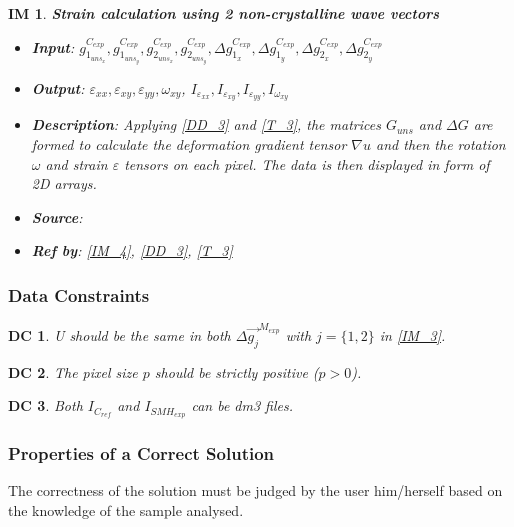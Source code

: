 \documentclass[12pt]{article}
\newtheorem{DC}{DC}
\newtheorem{IM}{IM}
\begin{document}
\begin{IM}
\label{IM_5}
\noindent\colorbox{shadecolorIM}{\normalfont \textbf{Strain calculation using 2 non-crystalline wave vectors}}
\normalfont
\begin{itemize}
\item \textbf{Input}: $g_{1_{{uns}_x}}^{C_{exp}}, g_{1_{{uns}_y}}^{C_{exp}},g_{2_{{uns}_x}}^{C_{exp}}, g_{2_{{uns}_y}}^{C_{exp}}, \Delta g_{1_{x}}^{C_{exp}}, \Delta g_{1_{y}}^{C_{exp}},\Delta g_{2_{x}}^{C_{exp}},\Delta g_{2_{y}}^{C_{exp}}$
\item \textbf{Output}: $\varepsilon_{xx},\varepsilon_{xy},\varepsilon_{yy},\omega_{xy}$, $I_{\varepsilon_{xx}},I_{\varepsilon_{xy}},I_{\varepsilon_{yy}},I_{\omega_{xy}}$
\item \textbf{Description}: Applying \cref{DD_3} and \cref{T_3}, the matrices $G_{uns}$ and $\Delta G$ are formed to calculate the deformation gradient tensor $\nabla u$ and then the rotation $\omega$ and strain $\varepsilon$ tensors on each pixel. The data is then displayed in form of 2D arrays.
\item \textbf{Source}: \cite{Hytch1998,Rouviere2005}
\item \textbf{Ref by}: \cref{IM_4}, \cref{DD_3}, \cref{T_3}
\end{itemize}
\end{IM}

\subsubsection{Data Constraints} \label{sec_DataConstraints}

\begin{DC}
\label{DC_1}
\normalfont U should be the same in both $\Delta \overrightarrow{g_{j}}^{M_{exp}}$ with $j=\{1,2\}$ in \cref{IM_3}.
\end{DC}    
\begin{DC}
\label{DC_2}
\normalfont The pixel size $p$ should be strictly positive ($p>0$).
\end{DC}
\begin{DC}
\label{DC_3}
\normalfont Both $I_{C_{ref}}$ and $I_{SMH_{exp}}$ can be dm3 files.
\end{DC}

\subsubsection{Properties of a Correct Solution} \label{sec_CorrectSolution}

\noindent
The correctness of the solution must be judged by the user him/herself based on the knowledge of the sample analysed.
\end{document}
